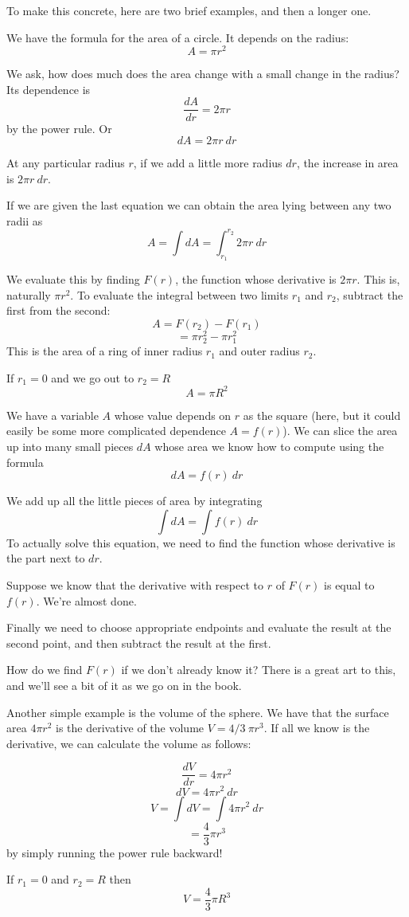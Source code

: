 To make this concrete, here are two brief examples, and then a longer one.

We have the formula for the area of a circle.  It depends on the radius:
\[ A = \pi r^2 \]

We ask, how does much does the area change with a small change in the radius?  Its dependence is
\[ \frac{dA}{dr} = 2 \pi r \]
by the power rule.  Or
\[ dA = 2 \pi r \ dr \]

At any particular radius $r$, if we add a little more radius $dr$, the increase in area is $2 \pi r \ dr$.

If we are given the last equation we can obtain the area lying between any two radii as
\[ A = \int dA = \int_{r_1}^{r_2} 2 \pi r \ dr \]

We evaluate this by finding $F(r)$, the function whose derivative is $2 \pi r$.  This is, naturally $\pi r^2$.  To evaluate the integral between two limits $r_1$ and $r_2$, subtract the first from the second:
\[ A = F(r_2) - F(r_1) \]
\[ = \pi r_2^2 - \pi r_1^2 \]
This is the area of a ring of inner radius $r_1$ and outer radius $r_2$.

If $r_1 = 0$ and we go out to $r_2 = R$
\[ A = \pi R^2 \]

We have a variable $A$ whose value depends on $r$ as the square (here, but it could easily be some more complicated dependence $A = f(r)$).  We can slice the area up into many small pieces $dA$ whose area we know how to compute using the formula
\[ dA = f(r) \ dr \]

We add up all the little pieces of area by integrating
\[ \int dA = \int f(r) \ dr \]
To actually solve this equation, we need to find the function whose derivative is the part next to $dr$.

Suppose we know that the derivative with respect to $r$ of $F(r)$ is equal to $f(r)$.  We're almost done.

Finally we need to choose appropriate endpoints and evaluate the result at the second point, and then subtract the result at the first.

How do we find $F(r)$ if we don't already know it?  There is a great art to this, and we'll see a bit of it as we go on in the book.

Another simple example is the volume of the sphere.  We have that the surface area $4 \pi r^2$ is the derivative of the volume $V = 4/3 \ \pi r^3$.  If all we know is the derivative, we can calculate the volume as follows:

\[ \frac{dV}{dr} = 4 \pi r^2 \]
\[ dV = 4 \pi r^2 \ dr \]
\[ V = \int  dV = \int 4 \pi r^2 \ dr \]
\[ = \frac{4}{3} \pi r^3 \]
by simply running the power rule backward!

If $r_1 = 0$ and $r_2 = R$ then
\[ V = \frac{4}{3} \pi R^3 \]